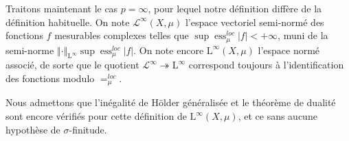 \documentclass[a4paper,12pt]{article}
\newcommand{\norm}[1]{\left\Vert #1\right\Vert}
\newcommand{\abs}[1]{\left\vert#1\right\vert}
\newcommand{\TODO}[1]{}%
\DeclareMathOperator{\ess}{ess}
\begin{document}
Traitons maintenant le cas $p=\infty$, pour lequel notre définition diffère de la définition habituelle. On note $\mathscr{L}^\infty(X, \mu)$ l'espace vectoriel semi-normé des fonctions $f$ mesurables complexes 
telles que $\sup\ess_\mu^{loc} \abs{f}<+\infty$, muni de la semi-norme $\norm{\cdot}_{\mathrm{L}^\infty} \sup\ess_\mu^{loc} \abs{f}$.
On note encore $\mathrm{L}^\infty(X, \mu)$ l'espace normé associé, de sorte que le quotient $\mathscr{L}^\infty\twoheadrightarrow\mathrm{L}^\infty$
correspond toujours à l'identification des fonctions modulo $=_\mu^{loc}$.

Nous admettons que l'inégalité de Hölder généralisée et le théorème de dualité sont encore vérifiés 
pour cette définition de $\mathrm{L}^\infty(X, \mu)$, et ce sans aucune hypothèse de $\sigma$-finitude. 


\TODO{Un peu plus d'explications quand même...}
\end{document}
